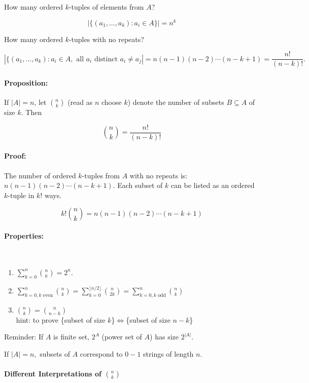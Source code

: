 \documentclass[a4paper, 11pt, twoside]{article}
\begin{document}
How many ordered $k$-tuples of elements from $A$?

\[|\{(a_1,\dots , a_k): a_i\in A\}| = n^k\]

How many ordered $k$-tuples with no repeats?

\[|\{(a_1,\dots, a_k): a_i\in A,\text{ all $a_i$ distinct $a_i\not= a_j$}|=n(n-1)(n-2)\cdots (n-k+1) = \frac{n!}{(n-k)!}.\]

\paragraph{Proposition:} If $|A| =n$, let ${n\choose k}$ (read as $n$ choose $k$) denote the number of subsets $B\subseteq A$ of size $k$. Then

\[{n \choose k} = \frac{n!}{(n-k)!}\]

\paragraph{Proof:} The number of ordered $k$-tuples from $A$ with no repeats is: $n(n-1)(n-2)\cdots (n-k+1)$. Each subset of $k$ can be listed as an ordered $k$-tuple in $k!$ ways.

\[k!{n \choose k}=n(n-1)(n-2)\cdots (n-k+1)\]

\paragraph{Properties:}\ \\

\begin{enumerate}
	\item $\sum\limits^n_{k=0}{n \choose k} = 2^n.$
	\item $\sum\limits^n_{k=0, k \text{ even}}{n \choose k} = \sum\limits^{\lfloor n/2\rfloor}_{k=0}{n \choose 2k} = \sum\limits^n_{k=0, k \text{ odd}}{n \choose k}$
	\item ${n \choose k} = {n \choose n-k}$\\
	hint: to prove \{subset of size $k$\}$\iff$\{subset of size $n-k$\}
\end{enumerate}

Reminder: If $A$ is finite set, $2^A$ (power set of $A$) has size $2^{|A|}$.

If $|A|=n,$ subsets of $A$ correspond to $0-1$ strings of length $n$.\\

\paragraph{Different Interpretations of ${n \choose k}$}\ \\ 
\end{document}
